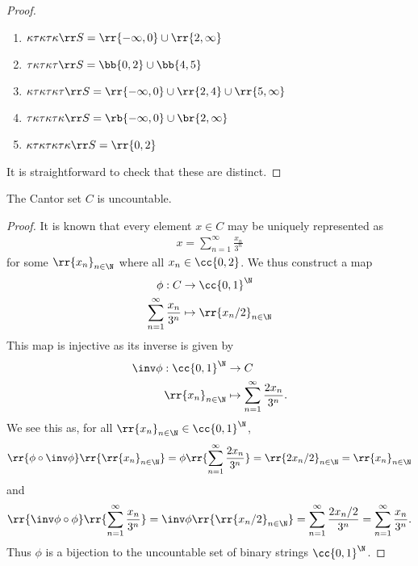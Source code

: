 \documentclass{article}
\begin{document}
\begin{claim*}[1]
\begin{proof}
\begin{enumerate}
			\item $\kappa\tau\kappa\tau\kappa\rr S=\rr{-\infty,0}\cup\rr{2,\infty}$
			\item $\tau\kappa\tau\kappa\tau\rr S=\bb{0,2}\cup\bb{4,5}$
			\item $\kappa\tau\kappa\tau\kappa\tau\rr S=\rr{-\infty,0}\cup\rr{2,4}\cup\rr{5,\infty}$
			\item $\tau\kappa\tau\kappa\tau\kappa\rr S=\rb{-\infty,0}\cup\br{2,\infty}$
			\item $\kappa\tau\kappa\tau\kappa\tau\kappa\rr S=\rr{0,2}$
		\end{enumerate}
		It is straightforward to check that these are distinct.
	\end{proof}
\end{claim*}

\begin{claim*}[2a]
	The Cantor set $C$ is uncountable.
	\begin{proof}
		It is known that every element $x\in C$ may be uniquely represented as
		\begin{align} \label{ternary}
			x = \sum_{n=1}^{ \infty } \frac{x_n}{3^n}
		\end{align}
		for some $\rr{x_n}_{n\in\N}$ where all $x_n\in\cc{0,2}$. We thus construct a map
		\begin{align*}
			\phi : C                              & \to \cc{0,1}^{\N}           \\
			\sum_{n=1}^{ \infty } \frac{x_n}{3^n} & \mapsto \rr{x_n/2}_{n\in\N}
		\end{align*}
		This map is injective as its inverse is given by
		\begin{align*}
			\inv\phi : \cc{0,1}^\N & \to C                                         \\
			\rr{x_n}_{n\in\N}      & \mapsto \sum_{n=1}^{\infty} \frac{2x_n}{3^n}.
		\end{align*}
		We see this as, for all $\rr{x_n}_{n\in\N}\in \cc{0,1}^\N$,
		\begin{align*}
			\rr{\phi\circ\inv\phi}\rr{\rr{x_n}_{n\in\N}} = \phi\rr{\sum_{n=1}^{\infty} \frac{2x_n}{3^n}} = \rr{2x_n/2}_{n\in\N} = \rr{x_n}_{n\in\N}
		\end{align*}
		and
		\begin{align*}
			\rr{\inv\phi\circ\phi}\rr{\sum_{n=1}^{\infty} \frac{x_n}{3^n}} = \inv\phi\rr{\rr{x_n/2}_{n\in\N}} = \sum_{n=1}^{\infty} \frac{2x_n/2}{3^n} = \sum_{n=1}^{\infty} \frac{x_n}{3^n}.
		\end{align*}
		Thus $\phi$ is a bijection to the uncountable set of binary strings $\cc{0,1}^\N$.
	\end{proof}
\end{claim*}
\end{document}
